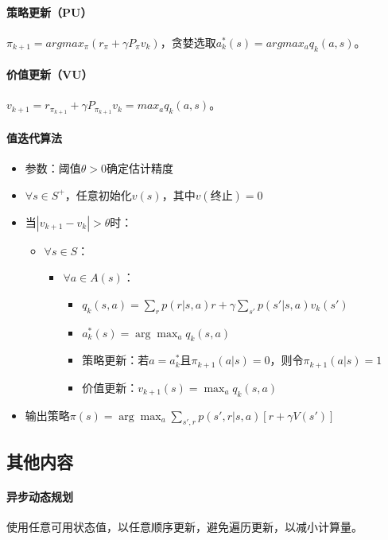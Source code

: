 \documentclass[
12pt, %
a4paper, 
oneside, %
headinclude,footinclude, %
]{scrartcl}
\begin{document}
\paragraph{策略更新（PU）}
$ \pi_{k + 1} = argmax_{\pi}(r_{\pi} + \gamma P_{\pi}v_k) $，贪婪选取$ a^*_k(s) = argmax_a q_k(a, s) $。
\paragraph{价值更新（VU）}
$ v_{k + 1} = r_{\pi_{k + 1}} + \gamma P_{\pi_{k + 1}}v_k = max_a q_k(a, s) $。
\paragraph{值迭代算法}
\begin{itemize}
\item 参数：阈值$ \theta > 0 $确定估计精度
\item $ \forall s \in S^+ $，任意初始化$ v(s) $，其中$ v(\text{终止}) = 0 $
\item 当$ |v_{k + 1} - v_k| > \theta $时：
\begin{itemize}
\item $ \forall s \in S $：
\begin{itemize}
\item $ \forall a \in A(s) $：
\begin{itemize}
\item $ q_k(s, a) = \sum_r p(r|s, a)r + \gamma \sum_{s'} p(s'|s, a)v_k(s') $
\item $ a^*_k(s) = \arg\max_a q_k(s, a) $
\item 策略更新：若$ a = a^*_k $且$ \pi_{k + 1}(a|s) = 0 $，则令$ \pi_{k + 1}(a|s) = 1 $
\item 价值更新：$ v_{k + 1}(s) = \max_a q_k(s, a) $
\end{itemize}
\end{itemize}
\end{itemize}
\item 输出策略$ \pi(s) = \arg\max_a \sum_{s',r}p(s',r|s,a)[r + \gamma V(s')] $
\end{itemize}
\subsection{其他内容}
\paragraph{异步动态规划}
使用任意可用状态值，以任意顺序更新，避免遍历更新，以减小计算量。
\end{document}
